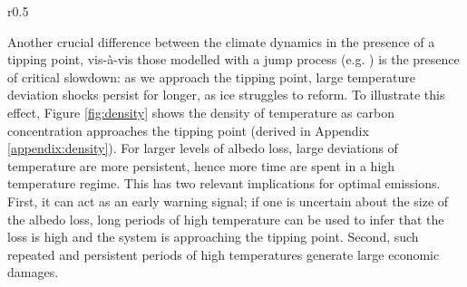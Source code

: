 \documentclass[../../main.tex]{subfiles}
\begin{document}
\begin{wrapfigure}{r}{0.5\textwidth}
    \centering
    
    \caption{Density of temperature shocks at $M = 600$.}
    \label{fig:density}
\end{wrapfigure}
Another crucial difference between the climate dynamics in the presence of a tipping point, vis-à-vis those modelled with a jump process (e.g. \citealt{dietz_economic_2021,hambel_optimal_2021}) is the presence of critical slowdown: as we approach the tipping point, large temperature deviation shocks persist for longer, as ice struggles to reform. To illustrate this effect, Figure \ref{fig:density} shows the density of temperature as carbon concentration approaches the tipping point (derived in Appendix \ref{appendix:density}). For larger levels of albedo loss, large deviations of temperature are more persistent, hence more time are spent in a high temperature regime. This has two relevant implications for optimal emissions. First, it can act as an early warning signal; if one is uncertain about the size of the albedo loss, long periods of high temperature can be used to infer that the loss is high and the system is approaching the tipping point. Second, such repeated and persistent periods of high temperatures generate large economic damages.
\fi
\end{document}
